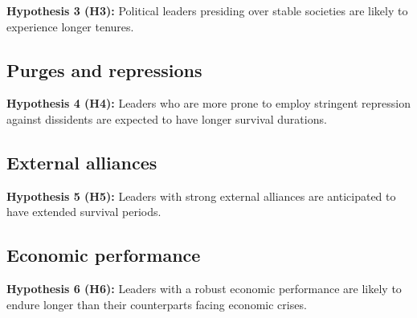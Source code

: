 \documentclass[
  12pt,
  a4paper,
  12pt]{article}
\begin{document}
\textbf{Hypothesis 3 (H3):} Political leaders presiding over stable
societies are likely to experience longer tenures.

\hypertarget{purges-and-repressions}{%
\subsection{Purges and repressions}\label{purges-and-repressions}}

\textbf{Hypothesis 4 (H4):} Leaders who are more prone to employ
stringent repression against dissidents are expected to have longer
survival durations.

\hypertarget{external-alliances}{%
\subsection{External alliances}\label{external-alliances}}

\textbf{Hypothesis 5 (H5):} Leaders with strong external alliances are
anticipated to have extended survival periods.

\hypertarget{economic-performance}{%
\subsection{Economic performance}\label{economic-performance}}

\textbf{Hypothesis 6 (H6):} Leaders with a robust economic performance
are likely to endure longer than their counterparts facing economic
crises.

\newpage


\renewcommand\refname{References}
  
\end{document}

